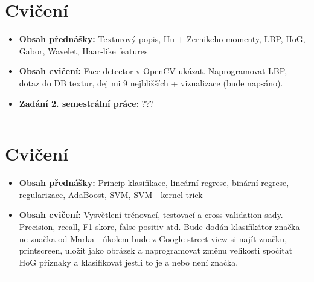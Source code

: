 \documentclass[12pt, a4paper]{article}
\begin{document}
\section{Cvičení}
\begin{itemize}
	\item \par{\textbf{Obsah přednášky:} Texturový popis, Hu + Zernikeho momenty, LBP, HoG, Gabor, Wavelet, Haar-like features}
	\item \par{\textbf{Obsah cvičení:} Face detector v OpenCV ukázat. Naprogramovat LBP, dotaz do DB textur, dej mi 9 nejbližších + vizualizace (bude napsáno).}
	\item \par{\textbf{Zadání 2. semestrální práce:} {\color{red}???}}
\end{itemize}
\noindent\rule[0.5ex]{\linewidth}{0.4pt}











\section{Cvičení}
\begin{itemize}
	\item \par{\textbf{Obsah přednášky:} Princip klasifikace, lineární regrese, binární regrese, regularizace, AdaBoost, SVM, SVM - kernel trick}
	\item \par{\textbf{Obsah cvičení:} Vysvětlení trénovací, testovací a cross validation sady. Precision, recall, F1 skore, false positiv atd. {\color{red}Bude dodán klasifikátor značka ne-značka od Marka} - úkolem bude z Google street-view si najít značku, printscreen, uložit jako obrázek a naprogramovat změnu velikosti spočítat HoG příznaky a klasifikovat jestli to je a nebo není značka.}
\end{itemize}
\noindent\rule[0.5ex]{\linewidth}{0.4pt}













\end{document}
